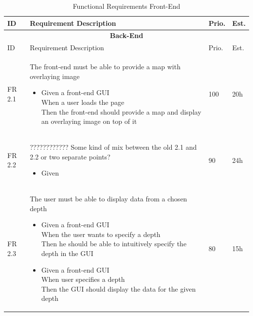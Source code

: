 \documentclass[11pt,a4paper,titlepage,oneside]{report}
\begin{document}
  \begin{longtable}{p{1.4cm} p{7.8cm} p{1cm} p{1cm} }
  \caption[]{Functional Requirements Front-End} \\
  \hline \hline
  \multicolumn{1}{p{1.4cm}}{ID} &
  \multicolumn{1}{p{7.8cm}}{Requirement Description} &
  \multicolumn{1}{p{1cm}}{Prio.} &
  \multicolumn{1}{p{1cm}}{Est.}
  \endhead

  \caption[Functional Requirements Front-End]{} \label{funcReqsFront} \\
  \hline \multicolumn{4}{c}{\textbf{Back-End}} \\
  \multicolumn{1}{p{1.4cm}}{ID} &
  \multicolumn{1}{p{7.8cm}}{Requirement Description} &
  \multicolumn{1}{p{1cm}}{Prio.} &
  \multicolumn{1}{p{1cm}}{Est.}
  \endfirsthead

  \hline
  \multicolumn{4}{r}{{Continued on next page}} \\
  \endfoot

  \hline \hline
  \endlastfoot
  
  \hline
  FR 2.1 & The front-end must be able to provide a map with overlaying image
  \begin{itemize}
  \item \parbox[t]{6.8cm}{
        Given a front-end GUI \\
        When a user loads the page \\
        Then the front-end should provide a map and display an overlaying image on top of it}
  \end{itemize}
  & 100 & 20h \\ \hline

  FR 2.2 & ???????????? Some kind of mix between the old 2.1 and 2.2 or two separate points?
  \begin{itemize}
  \item \parbox[t]{6.8cm}{
        Given }
  \end{itemize}
  & 90 & 24h \\ \hline

  FR 2.3 & The user must be able to display data from a chosen depth
  \begin{itemize}
  \item \parbox[t]{6.8cm}{
        Given a front-end GUI \\
        When the user wants to specify a depth \\
        Then he should be able to intuitively specify the depth in the GUI}
  \item \parbox[t]{6.8cm}{
        Given a front-end GUI \\
        When user specifies a depth \\
        Then the GUI should display the data for the given depth}
  \end{itemize}
  & 80 & 15h \\ \hline


\end{longtable}
\end{document}
